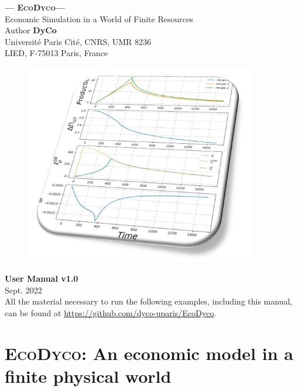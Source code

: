 \documentclass[12pt,a4paper]{article}%
\date{}
\newcommand{\ed}{\textsc{EcoDyco}}
\begin{document}
\begin{titlepage}

	\centering
		{\Huge \textbf{--- \ed ---} \\[0pt]}
		{\Large Economic Simulation in a World of Finite Resources \\[1cm]}
		\Large Author \textbf{DyCo} \\ 
		\large Universit\'e Paris Cit\'e, CNRS, UMR 8236 \\
		 LIED, F-75013 Paris, France
		\vspace{1cm}

		\begin{figure}[h]
			\centering \includegraphics[width=0.9\textwidth]{figures/couverture.jpg}
		\end{figure}
	
		\vspace{1cm}
		{\Huge \textbf{User Manual v1.0} \\[0.5cm]}
		{\Large Sept. 2022 \\[0.5cm]}
		{\large All the material necessary to run the following examples, including this manual, can be found at \url{https://github.com/dyco-uparis/EcoDyco}. 
		}

\end{titlepage}
\restoregeometry

\tableofcontents
\setcounter{page}{1}

\newpage

\section{\ed: An economic model in a finite physical world}
\end{document}
